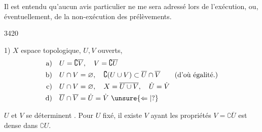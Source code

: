 Il est entendu qu'aucun avis particulier ne me sera adressé lors de l'exécution, ou, éventuellement, de la non-exécution des prélèvements.

\begin{flushright}\small 3420\\\end{flushright}

1) $X$ espace topologique, $U,V$ ouverts,  
\[
\begin{aligned}
\text{a)}\quad & U=\complement\overline V,\quad V=\complement\overline U\\
\text{b)}\quad & U\cap V=\varnothing,\quad\complement(U\cup V)\subset\overline U\cap\overline V
 \qquad\text{(d'où égalité.)}\\
\text{c)}\quad & U\cap V=\varnothing,\quad X=\overline{U\cup V},\quad\dot U=\dot V\\
\text{d)}\quad & \overline U\cap\overline V=\dot U=\dot V\ \unsure{\Leftarrow|?}
\end{aligned}
\]

$U$ et $V$ se déterminent . Pour $U$ fixé, il existe $V$ ayant les propriétés   $V=\complement\overline U$ est dense dans $\complement U$.

